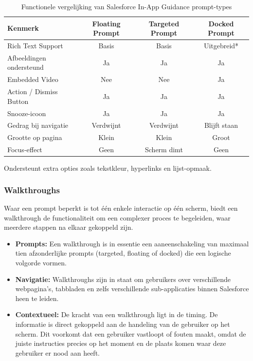 \begin{table}[H]
	\centering
	\caption{Functionele vergelijking van Salesforce In-App Guidance prompt-types}
	\label{tab:prompt_vergelijking}
	\small
	\begin{tabular}{@{}lccc@{}}
		\toprule
		\textbf{Kenmerk } & \textbf{Floating Prompt} & \textbf{Targeted Prompt} & \textbf{Docked Prompt} \\ \midrule
		Rich Text Support            & Basis     & Basis     & Uitgebreid* \\
		Afbeeldingen ondersteund     & Ja        & Ja        & Ja           \\
		Embedded Video               & Nee       & Nee       & Ja           \\
		Action / Dismiss Button      & Ja        & Ja        & Ja           \\
		Snooze-icoon                 & Ja        & Ja        & Ja           \\ 
		Gedrag bij navigatie         & Verdwijnt & Verdwijnt & Blijft staan \\
		Grootte op pagina            & Klein     & Klein     & Groot        \\
		Focus-effect                 & Geen      & Scherm dimt & Geen        \\ \midrule
	\end{tabular}
	\begin{flushleft}
		\footnotesize *Ondersteunt extra opties zoals tekstkleur, hyperlinks en lijst-opmaak.
	\end{flushleft}
\end{table}

\subsubsection{Walkthroughs}
Waar een prompt beperkt is tot één enkele interactie op één scherm, biedt een walkthrough de functionaliteit om een complexer proces te begeleiden, waar meerdere stappen na elkaar gekoppeld zijn.

\begin{itemize}
	\item \textbf{Prompts:} Een walkthrough is in essentie een aaneenschakeling van maximaal tien afzonderlijke prompts (targeted, floating of docked) die een logische volgorde vormen.
	\item \textbf{Navigatie:} Walkthroughs zijn in staat om gebruikers over verschillende webpagina's, tabbladen en zelfs verschillende sub-applicaties binnen Salesforce heen te leiden.
	\item \textbf{Contextueel:} De kracht van een walkthrough ligt in de timing. De informatie is direct gekoppeld aan de handeling van de gebruiker op het scherm. Dit voorkomt dat een gebruiker vastloopt of fouten maakt, omdat de juiste instructies precies op het moment en de plaats komen waar deze gebruiker er nood aan heeft.
\end{itemize}

